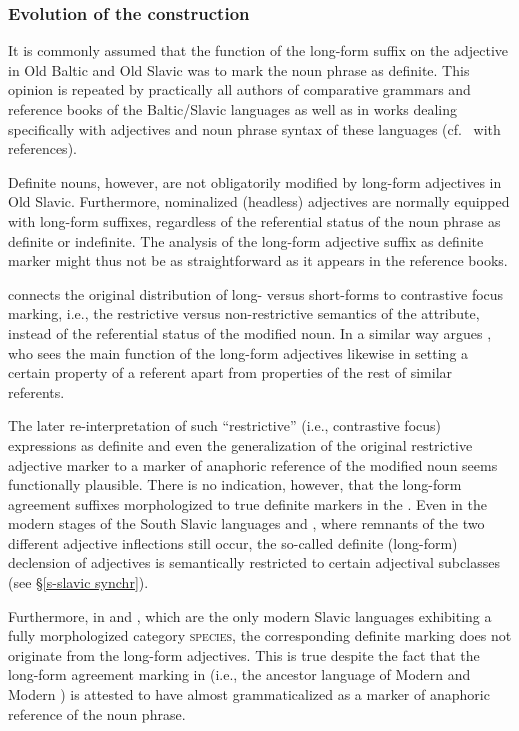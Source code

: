 \subsubsection{Evolution of the construction} 
It is commonly assumed that the function of the long-form suffix on the adjective in Old Baltic and Old Slavic was to mark the noun phrase as definite. This opinion is repeated by practically all authors of comparative grammars and reference books of the Baltic\slash{}Slavic languages as well as in works dealing specifically with adjectives and noun phrase syntax of these languages (cf.~\citealt[211]{mendoza2004} with references).

Definite nouns, however, are not obligatorily modified by long-form adjectives in Old Slavic. Furthermore, nominalized (headless) adjectives are normally equipped with long-form suffixes, regardless of the referential status of the noun phrase as definite or indefinite. The analysis of the long-form adjective suffix as definite marker might thus not be as straightforward as it appears in the reference books. 

\citet[214–215]{mendoza2004} connects the original distribution of long- versus short-forms to contrastive focus marking, i.e., the restrictive versus non\hyp{}restrictive semantics of the attribute, instead of the referential status of the modified noun. In a similar way argues \citet{tolstoj1957}, who sees the main function of the long-form adjectives likewise in setting a certain property of a referent apart from properties of the rest of similar referents. 

The later re-interpretation of such “restrictive” (i.e., contrastive focus) expressions as definite and even the generalization of the original restrictive adjective marker to a marker of anaphoric reference of the modified noun seems functionally plausible. There is no indication, however, that the long-form agreement suffixes morphologized to true definite markers in the . Even in the modern stages of the South Slavic languages  and , where remnants of the two different adjective inflections still occur, the so-called definite (long-form) declension of adjectives is semantically restricted to certain adjectival subclasses (see \S\ref{s-slavic synchr}).

Furthermore, in  and , which are the only modern Slavic languages exhibiting a fully morphologized category \textsc{species}, the corresponding definite marking does not originate from the long-form adjectives. This is true despite the fact that the long-form agreement marking in  (i.e., the ancestor language of Modern  and Modern ) is attested to have almost grammaticalized as a marker of anaphoric reference of the noun phrase.

